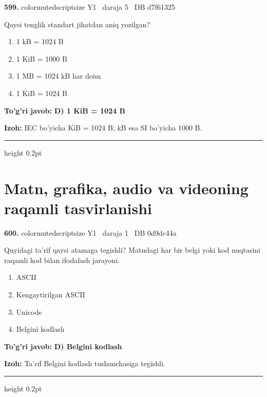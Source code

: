 \documentclass[10pt,a4paper,oneside]{article}
\begin{document}
\noindent\textbf{\color{ink}599.}  {color{muted}scriptsize Y1 \textbullet\ daraja 5 \textbullet\ DB d7f61325}
\par
Qaysi tenglik standart jihatdan aniq yozilgan?
\begin{enumerate}[label=\Alph*),leftmargin=9mm]
\item 1 kB = 1024 B
\item 1 KiB = 1000 B
\item 1 MB = 1024 kB har doim
\item 1 KiB = 1024 B
\end{enumerate}
\begin{tcolorbox}[enhanced,breakable,colback=teal!4,colframe=teal!50!black,boxrule=0.5pt,arc=1.1mm,left=3mm,right=3mm,top=1.7mm,bottom=1.7mm,before skip=2mm,after skip=2mm]
\textbf{\color{teal}To'g'ri javob:} \textbf{D) 1 KiB = 1024 B}
\par\smallskip
\textbf{Izoh:} IEC bo'yicha KiB = 1024 B; kB esa SI bo'yicha 1000 B.
\end{tcolorbox}
\vspace{2mm}\hrule height 0.2pt \vspace{3mm}
\section{Matn, grafika, audio va videoning raqamli tasvirlanishi}

\noindent\textbf{\color{ink}600.}  {color{muted}scriptsize Y1 \textbullet\ daraja 1 \textbullet\ DB 0d9dc44a}
\par
Quyidagi ta'rif qaysi atamaga tegishli? Matndagi har bir belgi yoki kod nuqtasini raqamli kod bilan ifodalash jarayoni.
\begin{enumerate}[label=\Alph*),leftmargin=9mm]
\item ASCII
\item Kengaytirilgan ASCII
\item Unicode
\item Belgini kodlash
\end{enumerate}
\begin{tcolorbox}[enhanced,breakable,colback=teal!4,colframe=teal!50!black,boxrule=0.5pt,arc=1.1mm,left=3mm,right=3mm,top=1.7mm,bottom=1.7mm,before skip=2mm,after skip=2mm]
\textbf{\color{teal}To'g'ri javob:} \textbf{D) Belgini kodlash}
\par\smallskip
\textbf{Izoh:} Ta'rif Belgini kodlash tushunchasiga tegishli.
\end{tcolorbox}
\vspace{2mm}\hrule height 0.2pt \vspace{3mm}
\end{document}
